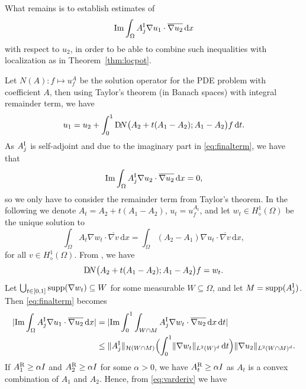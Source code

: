 \documentclass[reqno]{amsart}
\numberwithin{equation}{section}
\numberwithin{figure}{section}
\numberwithin{table}{section}
\theoremstyle{plain}
\theoremstyle{definition}
\theoremstyle{remark}
\newcommand{\norm}[1]{\lVert#1\rVert}
\newcommand{\abs}[1]{\lvert#1\rvert}
\newcommand{\imdel}{\mathop{\textup{Im}}}
\newcommand{\suppm}{\mathop{\textup{supp}}}
\newcommand{\di}{\mathrm{d}}   %
\newcommand{\upR}{^{\textup{R}}}
\newcommand{\upI}{^{\textup{I}}}
\newcommand{\AR}{A\upR}
\newcommand{\AI}{A\upI}
\begin{document}
	What remains is to establish estimates of
	\begin{equation} \label{eq:finalterm}
		\imdel \int_\Omega \AI_j\nabla u_1\cdot\overline{\nabla u_2}\,\di x
	\end{equation}
	with respect to $u_2$, in order to be able to combine such inequalities with localization as in Theorem~\ref{thm:locpot}.
	
	Let $N(A) \colon f\mapsto u_f^A$ be the solution operator for the PDE problem with coefficient $A$, then using Taylor's theorem (in Banach spaces) with integral remainder term, we have
	\begin{equation*}
		u_1 = u_2 + \int_0^1 \textup{D}\!N\bigl(A_2 + t(A_1-A_2);A_1-A_2\bigr)f\,\di t.
	\end{equation*}
	As $\AI_j$ is self-adjoint and due to the imaginary part in \eqref{eq:finalterm}, we have that 
	\begin{equation*} 
		\imdel \int_\Omega \AI_j\nabla u_2\cdot\overline{\nabla u_2}\,\di x = 0,
	\end{equation*}
	so we only have to consider the remainder term from Taylor's theorem. In the following we denote $A_t = A_2 + t(A_1-A_2)$, $u_t = u_f^{A_t}$, and let $w_t\in H^1_\diamond(\Omega)$ be the unique solution to
	\begin{equation} \label{eq:varderiv}
		\int_\Omega A_t\nabla w_t\cdot\overline{\nabla v}\,\di x = \int_\Omega (A_2-A_1)\nabla u_t\cdot\overline{\nabla v}\,\di x,
	\end{equation}
	for all $v\in H^1_\diamond(\Omega)$. From \cite[theorem 3.3]{Garde2022c}, we have
	\begin{equation*}
		\textup{D}\!N\bigl(A_2 + t(A_1-A_2);A_1-A_2\bigr)f = w_t.
	\end{equation*}
	Let $\bigcup_{t\in[0,1]}\suppm(\nabla w_t)\subseteq W$ for some measurable $W\subseteq \Omega$, and let $M = \suppm(\AI_j)$. Then \eqref{eq:finalterm} becomes
	\begin{align} \label{eq:finaltemest1}
		\abs{\imdel \int_\Omega \AI_j\nabla u_1\cdot\overline{\nabla u_2}\,\di x} &= \abs{\imdel \int_0^1\int_{W\cap M} \AI_j\nabla w_t\cdot\overline{\nabla u_2}\,\di x\,\di t} \notag \\
		&\leq \norm{\AI_j}_{\mathcal{H}(W\cap M)}\Bigl(\int_0^1\norm{\nabla w_t}_{L^2(W)^d}\,\di t \Bigr)\norm{\nabla u_2}_{L^2(W\cap M)^d}.
	\end{align}
	If $\AR_1 \geq \alpha I$ and $\AR_2 \geq \alpha I$ for some $\alpha>0$, we have $\AR_t \geq \alpha I$ as $A_t$ is a convex combination of $A_1$ and $A_2$. Hence, from \eqref{eq:varderiv} we have
\end{document}
